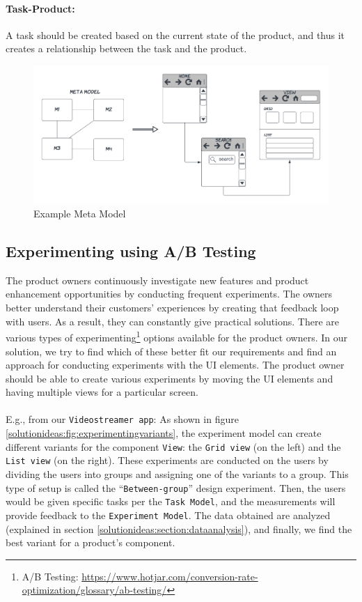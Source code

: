 \paragraph{Task-Product:} A task should be created based on the current state of the product, and thus it creates a relationship between the task and the product.

\begin{figure}[bt]
	\centering
  \includegraphics[width=1.05\textwidth]{images/solution-ideas/MetaModel.png}
	\caption{Example Meta Model}
	\label{solutionideas:fig:metamodel}
\end{figure}
\subsection{Experimenting using A/B Testing}

The product owners continuously investigate new features and product enhancement opportunities by conducting frequent experiments. 
The owners better understand their customers' experiences by creating that feedback loop with users. 
As a result, they can constantly give practical solutions. 
There are various types of experimenting\footnote{A/B Testing: \url{https://www.hotjar.com/conversion-rate-optimization/glossary/ab-testing/}} options available for the product owners.
In our solution, we try to find which of these better fit our requirements and find an approach for conducting experiments with the UI elements. 
The product owner should be able to create various experiments by moving the UI elements and having multiple views for a particular screen. \\ \\
E.g., from our \texttt{Videostreamer app}: As shown in figure \ref{solutionideas:fig:experimentingvariants}, the experiment model can create different variants for the component \texttt{View}: the \texttt{Grid view} (on the left) and the \texttt{List view} (on the right). 
These experiments are conducted on the users by dividing the users into groups and assigning one of the variants to a group. 
This type of setup is called the ``\texttt{Between-group}'' design experiment. 
Then, the users would be given specific tasks per the \texttt{Task Model}, and the measurements will provide feedback to the \texttt{Experiment Model}. 
The data obtained are analyzed (explained in section \ref{solutionideas:section:dataanalysis}), and finally, we find the best variant for a product's component. 

